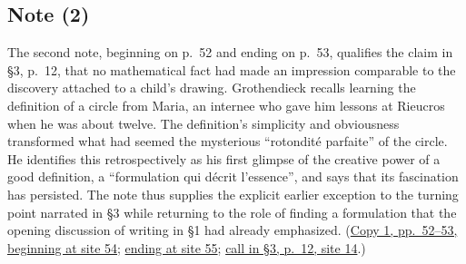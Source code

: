 \subsection*{Note (2)}
The second note, beginning on p.~52 and ending on p.~53, qualifies the
claim in \S3, p.~12, that no mathematical fact had made an impression
comparable to the discovery attached to a child's drawing. Grothendieck
recalls learning the definition of a circle from Maria, an internee
who gave him lessons at Rieucros when he was about twelve. The definition's
simplicity and obviousness transformed what had seemed the mysterious
``rotondité parfaite'' of the circle. He identifies this retrospectively
as his first glimpse of the creative power of a good definition, a
``formulation qui décrit l'essence'', and says that its fascination has
persisted. The note thus supplies the explicit earlier exception to the
turning point narrated in \S3 while returning to the role of finding a
formulation that the opening discussion of writing in \S1 had already
emphasized.
(\href{https://grothendieck.umontpellier.fr/web/viewer.html?file=../119.pdf\#page=55}{Copy 1, pp.~52--53, beginning at site 54};
\href{https://grothendieck.umontpellier.fr/web/viewer.html?file=../119.pdf\#page=56}{ending at site 55};
\href{https://grothendieck.umontpellier.fr/web/viewer.html?file=../119.pdf\#page=15}{call in \S3, p.~12, site 14}.)
